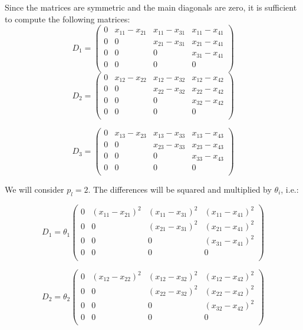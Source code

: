 \documentclass[
  letterpaper,
  DIV=11,
  numbers=noendperiod]{scrreprt}
\begin{document}
\begin{tcolorbox}
Since the matrices are symmetric and the main diagonals are zero, it is
sufficient to compute the following matrices: \[
D_1 = \begin{pmatrix} 0 & x_{11} - x_{21} & x_{11} -x_{31} & x_{11} - x_{41} \\  0 &  0 & x_{21} -x_{31} & x_{21} - x_{41} \\ 0 & 0 & 0 & x_{31} - x_{41} \\ 0 & 0 & 0 & 0 \\\end{pmatrix}
\] \[
D_2 = \begin{pmatrix} 0 & x_{12} - x_{22} & x_{12} -x_{32} & x_{12} - x_{42} \\  0 & 0 & x_{22} -x_{32} & x_{22} - x_{42} \\ 0 & 0 & 0 & x_{32} - x_{42} \\ 0 & 0 & 0 & 0 \\
\end{pmatrix}
\]

\[
D_3 = \begin{pmatrix} 0 & x_{13} - x_{23} & x_{13} -x_{33} & x_{13} - x_{43} \\  0 & 0 & x_{23} -x_{33} & x_{23} - x_{43} \\ 0 & 0 & 0 & x_{33} - x_{43} \\ 0 & 0 & 0 & 0 \\\end{pmatrix}
\]

We will consider \(p_l=2\). The differences will be squared and
multiplied by \(\theta_i\), i.e.:

\[
D_1 = \theta_1 \begin{pmatrix} 0 & (x_{11} - x_{21})^2 & (x_{11} -x_{31})^2 & (x_{11} - x_{41})^2 \\  0 &  0 & (x_{21} -x_{31})^2 & (x_{21} - x_{41})^2 \\ 0 & 0 & 0 & (x_{31} - x_{41})^2 \\ 0 & 0 & 0 & 0 \\\end{pmatrix}
\]

\[
D_2 = \theta_2 \begin{pmatrix} 0 & (x_{12} - x_{22})^2 & (x_{12} -x_{32})^2 & (x_{12} - x_{42})^2 \\  0 & 0 & (x_{22} -x_{32})^2 & (x_{22} - x_{42})^2 \\ 0 & 0 & 0 & (x_{32} - x_{42})^2 \\ 0 & 0 & 0 & 0 \\\end{pmatrix}
\]


\end{tcolorbox}
\end{document}
